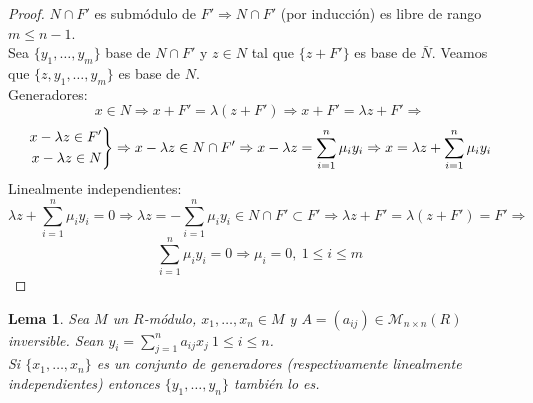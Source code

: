 \documentclass{article}
\newenvironment{rcases}
{\left.\begin{aligned}}
	{\end{aligned}\right\rbrace}
\theoremstyle{theorem-style}  %
\newtheorem{lemma}[theorem]{Lema}
\theoremstyle{definition}
\theoremstyle{example-style}
\begin{document}
\begin{proof}
		$N\cap F'$ es submódulo de $F' \Rightarrow N\cap F'$ (por inducción) es libre de rango $m\leq n-1$.\\
		Sea $\{y_1,\dots,y_m\}$ base de $N\cap F'$ y $z\in N$ tal que $\{z+F'\}$ es base de $\bar{N}$. Veamos que $\{z,y_1,\dots,y_m\}$ es base de $N$.\\
		Generadores:
		\[ x\in N \Rightarrow x+F'=\lambda(z+F') \Rightarrow x+F' = \lambda z + F' \Rightarrow\]
		\[\begin{rcases}
			x-\lambda z \in F' \\
			x-\lambda z \in N
	\end{rcases} \Rightarrow x-\lambda z \in N\cap F' \Rightarrow x-\lambda z = \sum_{i=1}^n\mu_iy_i \Rightarrow x=\lambda z + \sum_{i=1}^n\mu_iy_i\]
	Linealmente independientes:
	\[\lambda z + \sum_{i=1}^n\mu_iy_i=0 \Rightarrow  \lambda z = -\sum_{i=1}^n\mu_iy_i \in N\cap F' \subset F' \Rightarrow \lambda z +F' = \lambda(z+F') = F' \Rightarrow\]
	\[\sum_{i=1}^n\mu_iy_i=0 \Rightarrow \mu_i=0,\ 1\leq i\leq m\]

	\end{proof}

	\begin{lemma}
		Sea $M$ un $R$-módulo, $x_1,\dots,x_n \in M$ y $A=(a_{ij}) \in\mathcal{M}_{n\times n}(R)$ inversible. Sean $y_i=\sum_{j=1}^n a_{ij}x_j \ 1\leq i\leq n$.\\
		Si $\{x_1,\dots,x_n\}$ es un conjunto de generadores (respectivamente linealmente independientes) entonces $\{y_1,\dots,y_n\}$ también lo es.
	\end{lemma}
\end{document}
